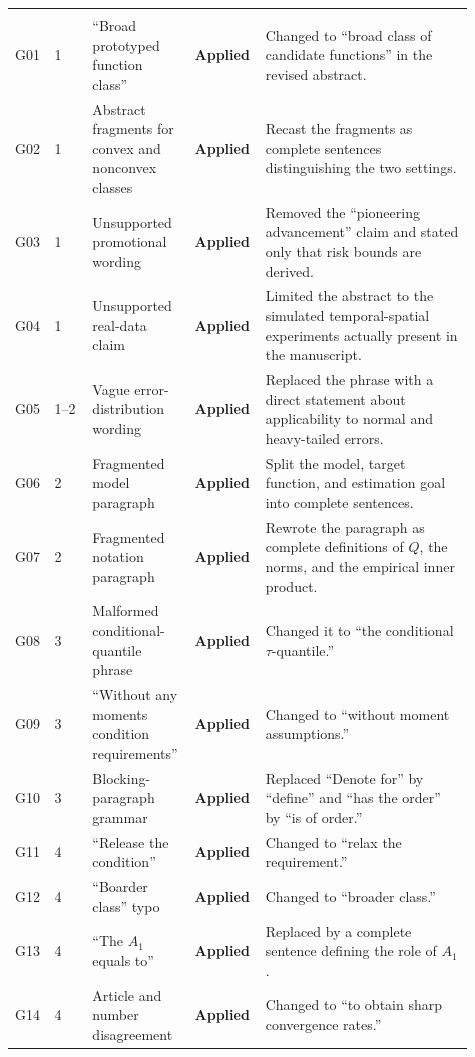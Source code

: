 \documentclass[10pt]{article}
\newcommand{\applied}{\textcolor{appliedgreen}{\textbf{Applied}}}
\begin{document}
\begin{landscape}
\begin{longtable}{L{0.045\linewidth}L{0.08\linewidth}L{0.21\linewidth}L{0.13\linewidth}L{0.445\linewidth}}
\addlinespace
{}\\
\addlinespace
{}G01 & 1 & ``Broad prototyped function class'' & \applied &
Changed to ``broad class of candidate functions'' in the revised abstract.\\
G02 & 1 & Abstract fragments for convex and nonconvex classes & \applied & Recast
the fragments as complete sentences distinguishing the two settings.\\
G03 & 1 & Unsupported promotional wording & \applied & Removed
the ``pioneering advancement'' claim and stated only that risk bounds are
derived.\\
G04 & 1 & Unsupported real-data claim & \applied & Limited the abstract to the
simulated temporal-spatial experiments actually present in the manuscript.\\
G05 & 1--2 & Vague error-distribution wording & \applied & Replaced
the phrase with a direct statement about applicability to normal and
heavy-tailed errors.\\
G06 & 2 & Fragmented model paragraph & \applied & Split the model, target function,
and estimation goal into complete sentences.\\
G07 & 2 & Fragmented notation paragraph & \applied & Rewrote the
paragraph as complete definitions of $Q$, the norms, and the empirical inner
product.\\
G08 & 3 & Malformed conditional-quantile phrase & \applied & Changed it to
``the conditional $\tau$-quantile.''\\
G09 & 3 & ``Without any moments condition requirements'' &
\applied & Changed to ``without moment assumptions.''\\
G10 & 3 & Blocking-paragraph grammar & \applied & Replaced ``Denote for'' by
``define'' and ``has the order'' by ``is of order.''\\
G11 & 4 & ``Release the condition'' & \applied & Changed to
``relax the requirement.''\\
G12 & 4 & ``Boarder class'' typo & \applied & Changed to ``broader class.''\\
G13 & 4 & ``The $A_1$ equals to'' & \applied & Replaced by a
complete sentence defining the role of $A_1$.\\
G14 & 4 & Article and number disagreement & \applied & Changed to ``to obtain sharp
convergence rates.''\\

\end{longtable}
\end{landscape}
\end{document}
